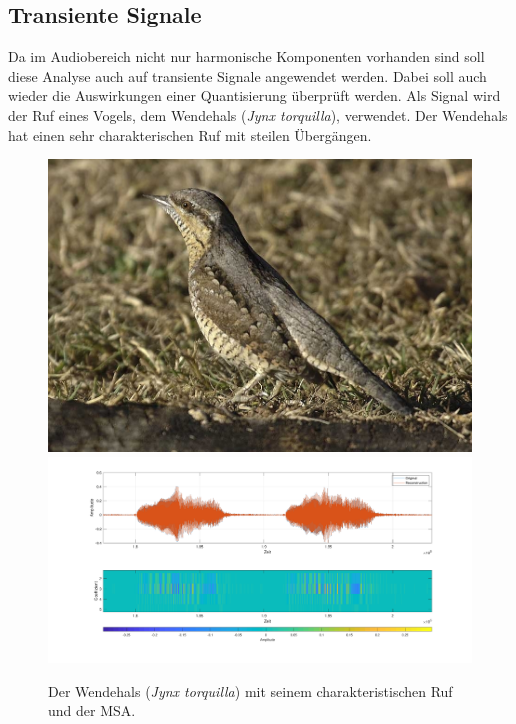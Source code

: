 \begin{refsection}
\subsection{Transiente Signale}
Da im Audiobereich nicht nur harmonische Komponenten vorhanden sind soll diese Analyse auch auf transiente Signale angewendet werden.
Dabei soll auch wieder die Auswirkungen einer Quantisierung überprüft werden.
Als Signal wird der Ruf eines Vogels, dem Wendehals (\textit{Jynx torquilla}), verwendet.
Der Wendehals hat einen sehr charakterischen Ruf mit steilen Übergängen.
\begin{figure}
	\includegraphics[width=0.4\linewidth]{papers/compress/Bilder/wendehals.jpg}
	\includegraphics[width=0.6\linewidth]{papers/compress/Bilder/jynxAll.pdf}
	\caption{Der Wendehals (\textit{Jynx torquilla}) \cite{wikipedia:wendehals} mit seinem charakteristischen Ruf und der MSA.}
	\label{fig:jynxAll}
\end{figure}


\end{refsection}
